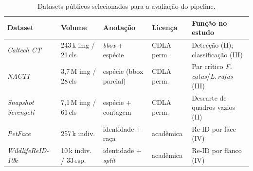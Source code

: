 \begin{table}[!htb]
\centering
\caption{Datasets públicos selecionados para a avaliação do pipeline.}
\label{tab:datasets-avaliacao}
\small
\begin{tabular}{@{}p{2.6cm}p{1.8cm}p{2.6cm}p{1.8cm}p{3.6cm}@{}}
\toprule
\textbf{Dataset} & \textbf{Volume} & \textbf{Anotação} & \textbf{Licença} & \textbf{Função no estudo} \\
\midrule
\emph{Caltech CT}~\cite{beery2018terra}        & 243\,k img / 21\,cls  & \emph{bbox} + espécie    & CDLA perm. & Detecção (II); classificação (III) \\
\emph{NACTI}~\cite{tabak2019nacti}             & 3{,}7\,M img / 28\,cls & espécie (bbox parcial)  & CDLA perm. & Par crítico \emph{F.\,catus}/\emph{L.\,rufus} (III) \\
\emph{Snapshot Serengeti}~\cite{norouzzadeh2018automatically} & 7{,}1\,M img / 61\,cls & espécie + contagem & CDLA perm. & Descarte de quadros vazios (II) \\
\emph{PetFace}~\cite{shinoda2024petface}       & 257\,k indiv.         & identidade + raça        & acadêmica  & Re-ID por face (IV) \\
\emph{WildlifeReID-10k}~\cite{adam2024wildlifereid10k} & 10\,k indiv. / 33\,esp. & identidade + \emph{split} & acadêmica & Re-ID por flanco (IV) \\
\bottomrule
\end{tabular}
\end{table}

